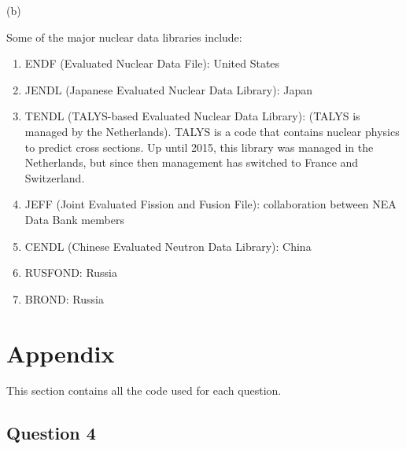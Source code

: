\documentclass[10pt]{article}
\newcommand*\circled[1]{\tikz[baseline=(char.base)]{
            \node[shape=circle,draw,inner sep=2pt] (char) {#1};}}
\begin{document}

\clearpage
(b) 

\circled{5} Some of the major nuclear data libraries include:

\begin{enumerate}
\item ENDF (Evaluated Nuclear Data File): United States
\item JENDL (Japanese Evaluated Nuclear Data Library): Japan
\item TENDL (TALYS-based Evaluated Nuclear Data Library): (TALYS is managed by the Netherlands). TALYS is a code that contains nuclear physics to predict cross sections. Up until 2015, this library was managed in the Netherlands, but since then management has switched to France and Switzerland.
\item JEFF (Joint Evaluated Fission and Fusion File): collaboration between NEA Data Bank members
\item CENDL (Chinese Evaluated Neutron Data Library): China
\item RUSFOND: Russia
\item BROND: Russia
\end{enumerate}

\section{Appendix}
This section contains all the code used for each question. 

\subsection{Question 4}

\end{document}

